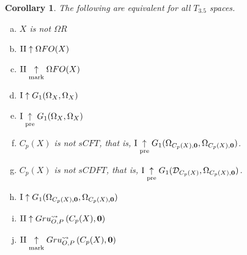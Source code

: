 \documentclass[11pt]{article}
\theoremstyle{plain}
\newtheorem{corollary}[theorem]{Corollary}
\theoremstyle{definition}
\theoremstyle{remark}
\theoremstyle{plain}
\theoremstyle{definition}
\theoremstyle{remark}
\begin{document}
\begin{corollary}
The following are equivalent for all \(T_{3.5}\) spaces.
\begin{enumerate}[a)]
\item \(X\) is not \(\Omega R\)
\item \(\mathrm{II}\uparrow \Omega FO(X)\)
\item \(\mathrm{II}\underset{\text{mark}}{\uparrow} \Omega FO(X)\)
\item \(\mathrm{I}\uparrow G_1(\Omega_X,\Omega_X)\)
\item \(\mathrm{I}\underset{\text{pre}}{\uparrow} G_1(\Omega_X,\Omega_X)\)
\item \(C_p(X)\) is not \(sCFT\), that is, 
  \(\mathrm{I}\underset{\text{pre}}{\uparrow} G_{1}(\Omega_{C_p(X),\mathbf 0},\Omega_{C_p(X),\mathbf 0})\).
\item \(C_p(X)\) is not \(sCDFT\), that is,
  \(\mathrm{I}\underset{\text{pre}}{\uparrow} G_{1}(\mathcal{D}_{C_p(X)},\Omega_{C_p(X),\mathbf 0})\).
\item \(\mathrm{I}\uparrow G_{1}(\Omega_{C_p(X),\mathbf 0},\Omega_{C_p(X),\mathbf 0})\)
\item \(\mathrm{II}\uparrow Gru_{O,P}^{\leadsto}\left({C_p(X)},{\mathbf 0}\right)\)
\item \(\mathrm{II}\underset{\text{mark}}{\uparrow}Gru_{O,P}^{\leadsto}\left({C_p(X)},{\mathbf 0}\right)\)
\end{enumerate}
\end{corollary}


  
  
\end{document}
